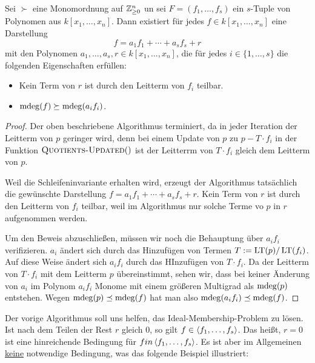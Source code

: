 \documentclass[11pt]{article}
\numberwithin{equation}{section}
\begin{document}
\begin{theorem} 
	Sei $\succ$ eine Monomordnung auf $\mathbb{Z}_{\ge 0}^n$ un sei $F = (f_1,\ldots,f_s)$ ein $s$-Tuple von Polynomen aus $k[x_1,\ldots,x_n]$. Dann existiert für jedes $f \in k[x_1,\ldots,x_n]$ eine Darstellung 
	\[
		f = a_1 f_1 + \cdots + a_s f_s + r
	\]
	mit den Polynomen $a_1,\ldots,a_s,r \in k[x_1,\ldots,x_n]$, die für jedes $i \in \{1,\ldots,s\}$ die folgenden Eigenschaften erfüllen: 
	\begin{itemize}
		\item Kein Term von $r$ ist durch den Leitterm von $f_i$ teilbar. 
		\item $ \operatorname{mdeg}(f) \succeq \operatorname{mdeg}(a_i f_i) $. 
	\end{itemize} 
\end{theorem} 
\begin{proof}
	Der oben beschriebene Algorithmus terminiert, da in jeder Iteration der Leitterm von $p$ geringer wird, denn bei einem Update von $p$ zu $p - T \cdot f_i$ in der Funktion $\mathop{\text{\textsc{Quotients-Updated}}}()$ ist der Leitterrm von $T \cdot f_i$ gleich dem Leitterm von $p$. 
	
	Weil die Schleifeninvariante erhalten wird,  erzeugt der Algorithmus tatsächlich die gewünschte Darstellung $f = a_1 f_1 + \cdots + a_s f_s + r$. Kein Term von $r$ ist durch den Leitterm von $f_i$ teilbar, weil im Algorithmus nur solche Terme vo $p$ in $r$ aufgenommen  werden. 
	
	Um den Beweis abzuschließen, müssen wir noch die Behauptung über $a_i f_i$ verifizieren. $a_i$ ändert sich durch das Hinzufügen von Termen $T: = \operatorname{LT}(p) / \operatorname{LT}(f_i)$. Auf diese Weise ändert sich $a_i f_i$ durch das HInzufügen von $T \cdot f_i $. Da der Leitterm von $T \cdot f_i$ mit dem Leitterm $p$ übereinstimmt, sehen wir, dass bei keiner Änderung von $a_i$ im Polynom $a_i f_i$ Monome mit einem größeren Multigrad als $\operatorname{mdeg}(p)$ entstehen. Wegen $\operatorname{mdeg}(p) \preceq \operatorname{mdeg}(f)$ hat man also $\operatorname{mdeg}(a_i f_i) \preceq \operatorname{mdeg}(f)$. 
\end{proof} 

Der vorige Algorithmus soll uns helfen, das Ideal-Membership-Problem zu lösen. Ist nach dem Teilen der Rest $r$ gleich $0$, so gilt $f \in \left< f_1,\ldots,f_s \right>$. Das heißt, $r=0$ ist eine hinreichende Bedingung für $f in \left< f_1,\ldots,f_s \right>$. Es ist aber im Allgemeinen \underline{keine} notwendige Bedingung, was das folgende Beispiel illustriert: 
\end{document}
